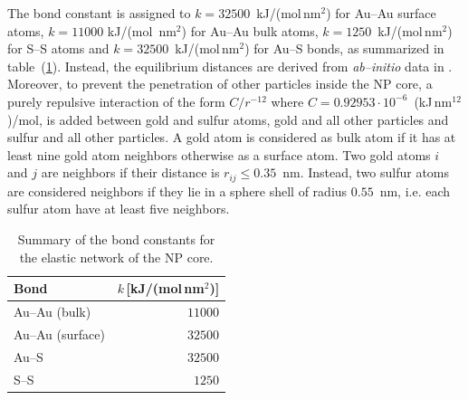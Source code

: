 The bond constant is assigned to $k = 32500$~kJ/(mol\,nm$^2$) for Au--Au surface atoms, $k = 11000$ kJ/(mol\ 
nm$^2$) for Au--Au bulk atoms, $k = 1250$~kJ/(mol\,nm$^2$) for S--S atoms and $k = 32500$~kJ/(mol\,nm$^2$) for 
Au--S bonds, as summarized in table~(\ref{tab:NPConstants}). Instead, the equilibrium distances are derived from 
\textit{ab--initio} data in \cite{clusterEquilibrium}. Moreover, to prevent the penetration of other particles 
inside the \ac{NP} core, a purely repulsive interaction of the form $C/r^{-12}$ where 
$C = 0.92953\cdot 10^{-6}$~(kJ\,nm$^{12}$)/mol, is added between gold and sulfur atoms, gold and all other 
particles and sulfur and all other particles. A gold atom is considered as bulk atom if it has at least nine gold 
atom neighbors otherwise as a surface atom. Two gold atoms $i$ and $j$ are neighbors if their distance is 
$r_{ij} \le 0.35$~nm. Instead, two sulfur atoms are considered neighbors if they lie in a sphere shell of radius 
$0.55$~nm, i.e. each sulfur atom have at least five neighbors.
\begin{table}[h!t]
	\centering
	\begin{tabular}{lr}
		\toprule
		Bond			 & $k$\,\footnotesize[kJ/(mol\,nm$^2$)] \\ \toprule
		Au--Au (bulk) 	 & $11000$ 	\\ \midrule
		Au--Au (surface) & $32500$ 	\\ \midrule
		Au--S			 & $32500$ 	\\ \midrule
		S--S			 & $1250$ 	\\ \bottomrule
	\end{tabular}
	\caption{Summary of the bond constants for the elastic network of the \acs{NP} core.}
	\label{tab:NPConstants}
\end{table}

